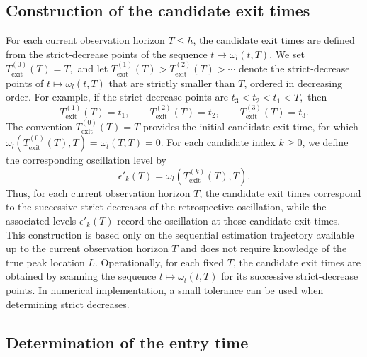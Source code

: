 \documentclass[12pt,a4paper]{article}
\begin{document}
\subsection{Construction of the candidate exit times}
\label{subsec:candidate-exit-times}

For each current observation horizon \(T\leq h\), the candidate exit times are defined from the strict-decrease points of the sequence
\(
t\longmapsto\omega_l(t,T).
\)
We set
\(
T_{\mathrm{exit}}^{(0)}(T)=T,
\)
and let
\(
T_{\mathrm{exit}}^{(1)}(T)>
T_{\mathrm{exit}}^{(2)}(T)>
\cdots
\)
denote the strict-decrease points of \(t\mapsto\omega_l(t,T)\) that are strictly smaller than \(T\), ordered in decreasing order.
For example, if the strict-decrease points are
\(
t_3<t_2<t_1<T,
\)
then
\[
T_{\mathrm{exit}}^{(1)}(T)=t_1,\qquad
T_{\mathrm{exit}}^{(2)}(T)=t_2,\qquad
T_{\mathrm{exit}}^{(3)}(T)=t_3.
\]
The convention
\(
T_{\mathrm{exit}}^{(0)}(T)=T
\)
provides the initial candidate exit time, for which
\(
\omega_l\left(T_{\mathrm{exit}}^{(0)}(T),T\right)
=
\omega_l(T,T)
=
0.
\)
For each candidate index \(k\geq0\), we define the corresponding oscillation level by
\[
\epsilon'_k(T)
=
\omega_l\left(
T_{\mathrm{exit}}^{(k)}(T),T
\right).
\]
Thus, for each current observation horizon \(T\), the candidate exit times correspond to the successive strict decreases of the retrospective oscillation, while the associated levels \(\epsilon'_k(T)\) record the oscillation at those candidate exit times.
This construction is based only on the sequential estimation trajectory available up to the current observation horizon \(T\) and does not require knowledge of the true peak location \(L\). Operationally, for each fixed \(T\), the candidate exit times are obtained by scanning the sequence
\(
t\longmapsto\omega_l(t,T)
\)
for its successive strict-decrease points. In numerical implementation, a small tolerance can be used when determining strict decreases.

\subsection{Determination of the entry time}
\label{subsec:entry-time}
\end{document}

